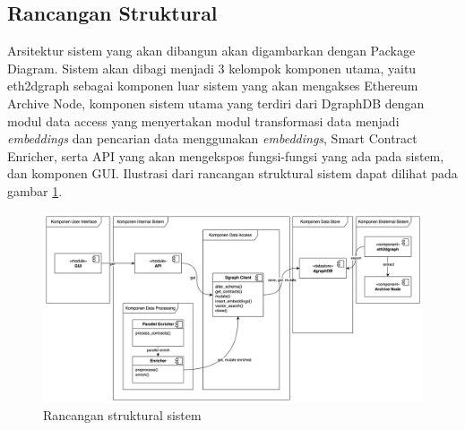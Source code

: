 \subsection{Rancangan Struktural}
\label{subsec:rancangan-struktural}

Arsitektur sistem yang akan dibangun akan digambarkan dengan Package Diagram. Sistem akan dibagi menjadi 3 kelompok komponen utama, yaitu eth2dgraph sebagai komponen luar sistem yang akan mengakses Ethereum Archive Node, komponen sistem utama yang terdiri dari DgraphDB dengan modul data access yang menyertakan modul transformasi data menjadi \textit{embeddings} dan pencarian data menggunakan \textit{embeddings}, Smart Contract Enricher, serta API yang akan mengekspos fungsi-fungsi yang ada pada sistem, dan komponen GUI. Ilustrasi dari rancangan struktural sistem dapat dilihat pada gambar \ref{image:rancangan-struktural}.

\begin{figure}[ht]
	\centering
	\includegraphics[width=1\textwidth]{resources/chapter-3/struktural.png}
	\caption{Rancangan struktural sistem}
	\label{image:rancangan-struktural}
\end{figure}